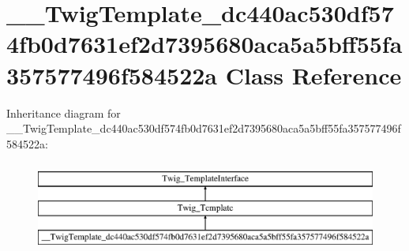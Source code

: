 \hypertarget{class_____twig_template__dc440ac530df574fb0d7631ef2d7395680aca5a5bff55fa357577496f584522a}{}\section{\+\_\+\+\_\+\+Twig\+Template\+\_\+dc440ac530df574fb0d7631ef2d7395680aca5a5bff55fa357577496f584522a Class Reference}
\label{class_____twig_template__dc440ac530df574fb0d7631ef2d7395680aca5a5bff55fa357577496f584522a}
Inheritance diagram for \+\_\+\+\_\+\+Twig\+Template\+\_\+dc440ac530df574fb0d7631ef2d7395680aca5a5bff55fa357577496f584522a\+:\begin{figure}[H]
\begin{center}
\leavevmode
\includegraphics[height=3.000000cm]{class_____twig_template__dc440ac530df574fb0d7631ef2d7395680aca5a5bff55fa357577496f584522a}
\end{center}
\end{figure}
